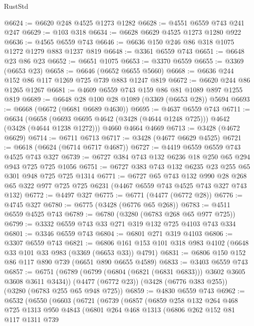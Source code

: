 \begin{lexlean}{RustStd}
\begin{coremodule}
@6624 := @6620 @248 @4525 @1273 @1282
@6628 := @4551 @6559 @743 @241 @247
@6629 := @103 @318
@6634 := @6628 @6629 @4525 @1273 @1280 @922
@6636 := @4565 @6559 @743
@6646 := @6636 @150 @246 @86 @318 @1075 @1272 @1279 @883 @1237 @819
@6648 := @3361 @6559 @743
@6651 := @6648 @23 @86 @23
@6652 := @6651 @1075
@6653 := @3370 @6559
@6655 := @3369 (@6653 @23)
@6658 := @6646 (@6652 @6655 @5660)
@6668 := @6636 @244 @152 @86 @117 @1269 @725 @739 @883 @1247 @819
@6672 := @6620 @244 @86 @1265 @1267
@6681 := @4609 @6559 @743 @159 @86 @81 @1089 @897 @1255 @819
@6689 := @6648 @28 @100 @28 @1089 (@3369 (@6653 @28)) @5694
@6693 := @6668 (@6672 (@6681 @6689 @4630))
@6695 := @4637 @6559 @743
@6711 := @6634
    (@6658 (@6693 @6695 @4642 (@3428 (@4644 @1248 @725))) @4642 (@3428 (@4644 @1238 @1272)))
    @4660
    @4664
    @4669
@6713 := @3428 (@4672 @6629)
@6714 := @6711 @6713
@6717 := @3428 (@4677 @6629 @4525)
@6721 := @6618 (@6624 (@6714 @6717 @4687))
@6727 := @4419 @6559 @6559 @743 @4525 @743 @327
@6739 := @6727 @384 @743 @132 @6236 @18 @250 @65 @294 @943 @725 @725 @1056
@6751 := @6727 @383 @743 @132 @6235 @23 @255 @65 @301 @948 @725 @725 @1314
@6771 := @6727
    @65
    @743
    @132
    @990
    @28
    @268
    @65
    @322
    @977
    @725
    @725
    @6231
    (@4467 @6559 @743 @4525 @743 @327 @743 @132)
@6772 := @4497 @327
@6775 := @6771 (@4477 (@6772 @28))
@6776 := @4745 @327
@6780 := @6775 (@3428 (@6776 @65 @268))
@6783 := @4511 @6559 @4525 @743
@6789 := @6780 (@3280 (@6783 @268 @65 @977 @725))
@6799 := @3332 @6559 @743 @33 @271 @319 @132 @725 @4103 @743 @334
@6801 := @3346 @6559 @743
@6804 := @6801 @271 @319 @4103
@6806 := @3307 @6559 @743
@6821 := @6806 @161 @153 @101 @318 @983 @4102 (@6648 @33 @101 @33 @983 (@3369 (@6653 @33)) @4791)
@6831 := @6806 @150 @152 @86 @117 @890 @739 (@6651 @890 @6655 @4589)
@6833 := @3403 @6559 @743
@6857 := @6751
    (@6789 (@6799 (@6804 (@6821 (@6831 @6833))) @3602 @3605 @3608 @3611 @3434))
    (@4477 (@6772 @23))
    (@3428 (@6776 @383 @255))
    (@3280 (@6783 @255 @65 @948 @725))
@6859 := @4830 @6559 @743
@6962 := @6532
    (@6550
      (@6603
        (@6721
          (@6739
            (@6857
              (@6859
                @258
                @132
                @264
                @468
                @725
                @1313
                @950
                @4843
                (@6801
                  @264
                  @468
                  @1313
                  (@6806
                    @262
                    @152
                    @81
                    @117
                    @1311
                    @739

\end{coremodule}
\end{lexlean}
